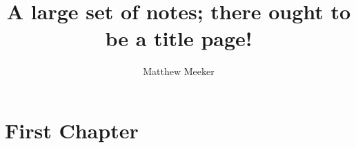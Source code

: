 \documentclass{amsart}
\title{A large set of notes; there ought to be a title page!}
\author{Matthew Meeker}
\begin{document}
\maketitle


\section{First Chapter}




\end{document}
